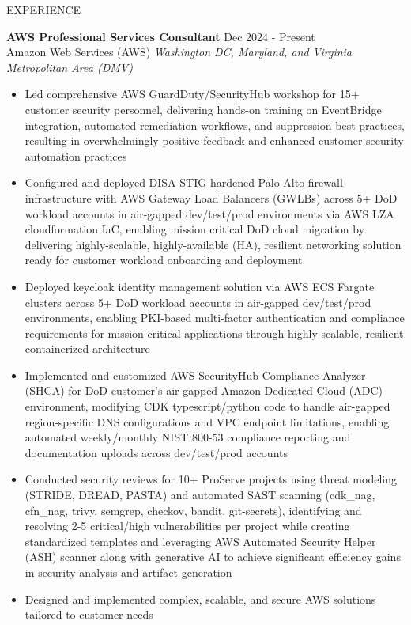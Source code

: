 \documentclass{resume} %
\begin{document}
\begin{rSection}{EXPERIENCE}

\textbf{AWS Professional Services Consultant} \hfill Dec 2024 - Present\\
Amazon Web Services (AWS) \hfill \textit{Washington DC, Maryland, and Virginia Metropolitan Area (DMV)}
 \begin{itemize}
    \itemsep -3pt {} 
     \item Led comprehensive AWS GuardDuty/SecurityHub workshop for 15+ customer security personnel, delivering hands-on training on EventBridge integration, automated remediation workflows, and suppression best practices, resulting in overwhelmingly positive feedback and enhanced customer security automation practices
     \item Configured and deployed DISA STIG-hardened Palo Alto firewall infrastructure with AWS Gateway Load Balancers (GWLBs) across 5+ DoD workload accounts in air-gapped dev/test/prod environments via AWS LZA cloudformation IaC, enabling mission critical DoD cloud migration by delivering highly-scalable, highly-available (HA), resilient networking solution ready for customer workload onboarding and deployment
     \item Deployed keycloak identity management solution via AWS ECS Fargate clusters across 5+ DoD workload accounts in air-gapped dev/test/prod environments, enabling PKI-based multi-factor authentication and compliance requirements for mission-critical applications through highly-scalable, resilient containerized architecture
     \item Implemented and customized AWS SecurityHub Compliance Analyzer (SHCA) for DoD customer's air-gapped Amazon Dedicated Cloud (ADC) environment, modifying CDK typescript/python code to handle air-gapped region-specific DNS configurations and VPC endpoint limitations, enabling automated weekly/monthly NIST 800-53 compliance reporting and documentation uploads across dev/test/prod accounts
     \item Conducted security reviews for 10+ ProServe projects using threat modeling (STRIDE, DREAD, PASTA) and automated SAST scanning (cdk\_nag, cfn\_nag, trivy, semgrep, checkov, bandit, git-secrets), identifying and resolving 2-5 critical/high vulnerabilities per project while creating standardized templates and leveraging AWS Automated Security Helper (ASH) scanner along with generative AI to achieve significant efficiency gains in security analysis and artifact generation
     \item Designed and implemented complex, scalable, and secure AWS solutions tailored to customer needs
 \end{itemize}


\end{rSection}
\end{document}
